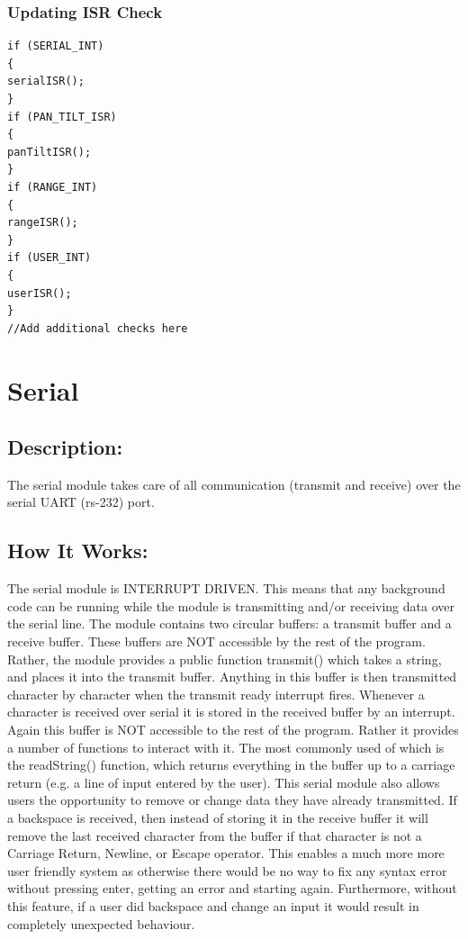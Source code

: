 \documentclass[]{report}
\begin{document}
\subsection{Updating ISR Check}
\begin{lstlisting}
if (SERIAL_INT)
{
serialISR();
}
if (PAN_TILT_ISR)
{
panTiltISR();
}
if (RANGE_INT)
{
rangeISR();
}
if (USER_INT)
{
userISR();
}
//Add additional checks here
\end{lstlisting}

\chapter{Serial}
\section{Description:}
The serial module takes care of all communication (transmit and receive) over the serial UART (rs-232) port.

\section{How It Works:}
The serial module is INTERRUPT DRIVEN. This means that any background code can be running while the module is transmitting and/or receiving data over the serial line. \newline
The module contains two circular buffers: a transmit buffer and a receive buffer. These buffers are NOT accessible by the rest of the program. Rather, the module provides a public function transmit() which takes a string, and places it into the transmit buffer. Anything in this buffer is then transmitted character by character when the transmit ready interrupt fires. \newline
Whenever a character is received over serial it is stored in the received buffer by an interrupt. Again this buffer is NOT accessible to the rest of the program. Rather it provides a number of functions to interact with it. The most commonly used of which is the readString() function, which returns everything in the buffer up to a carriage return (e.g. a line of input entered by the user). \newline
This serial module also allows users the opportunity to remove or change data they have already transmitted. If a backspace is received, then instead of storing it in the receive buffer it will remove the last received character from the buffer if that character is not a Carriage Return, Newline, or Escape operator. This enables a much more more user friendly system as otherwise there would be no way to fix any syntax error without pressing enter, getting an error and starting again. Furthermore, without this feature, if a user did backspace and change an input it would result in completely unexpected behaviour.
\end{document}
